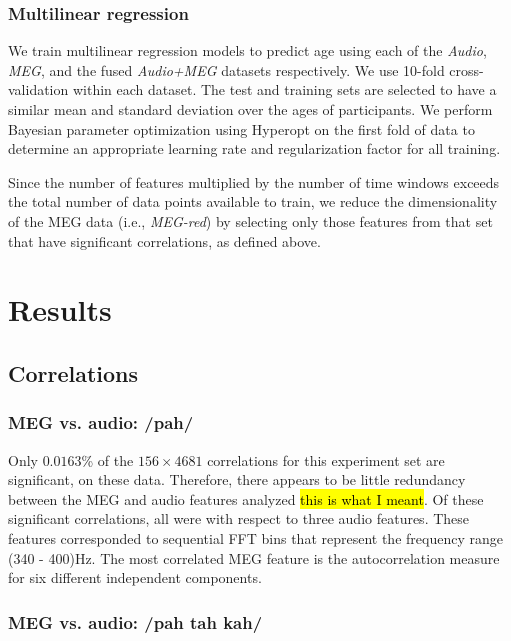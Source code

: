 \documentclass[a4paper]{article}
\newcommand{\DK}[1]{{\small \textcolor{blue}{\hl{#1}}}}
\begin{document}
\subsubsection{Multilinear regression}

We train multilinear regression models to predict age using each of the \textit{Audio}, \textit{MEG}, and the fused \textit{Audio+MEG} datasets respectively. We use 10-fold cross-validation within each dataset. The test and training sets are selected to have a similar mean and standard deviation over the ages of participants. We perform Bayesian parameter optimization using Hyperopt \cite{Bergstra2013} on the first fold of data to determine an appropriate learning rate and regularization factor for all training. %

Since the number of features multiplied by the number of time windows exceeds the total number of data points available to train, we reduce the dimensionality of the MEG data (i.e., {\em MEG-red}) by selecting only those features from that set that have significant correlations, as defined above.

\section{Results}

\subsection{Correlations}

\subsubsection{MEG vs. audio: /pah/}

Only $0.0163$\% of the $156 \times 4681$ correlations for this experiment set are significant, on these data. Therefore, there appears to be little redundancy between the MEG and audio features analyzed \DK{this is what I meant}. Of these significant correlations, all were with respect to three audio features. These features corresponded to sequential FFT bins that represent the frequency range (340 - 400)Hz. The most correlated MEG feature is the autocorrelation measure for six different independent components.

\subsubsection{MEG vs. audio: /pah tah kah/}
\end{document}

